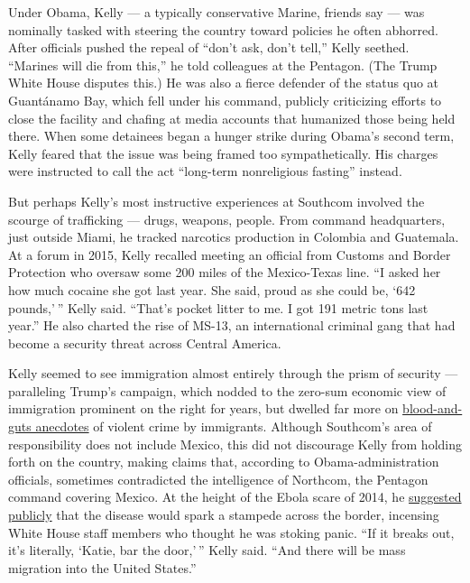 Under Obama, Kelly --- a typically conservative Marine, friends say ---
was nominally tasked with steering the country toward policies he often
abhorred. After officials pushed the repeal of ``don't ask, don't
tell,'' Kelly seethed. ``Marines will die from this,'' he told
colleagues at the Pentagon. (The Trump White House disputes this.) He
was also a fierce defender of the status quo at Guantánamo Bay, which
fell under his command, publicly criticizing efforts to close the
facility and chafing at media accounts that humanized those being held
there. When some detainees began a hunger strike during Obama's second
term, Kelly feared that the issue was being framed too sympathetically.
His charges were instructed to call the act ``long-term nonreligious
fasting'' instead.

But perhaps Kelly's most instructive experiences at Southcom involved
the scourge of trafficking --- drugs, weapons, people. From command
headquarters, just outside Miami, he tracked narcotics production in
Colombia and Guatemala. At a forum in 2015, Kelly recalled meeting an
official from Customs and Border Protection who oversaw some 200 miles
of the Mexico-Texas line. ``I asked her how much cocaine she got last
year. She said, proud as she could be, `642 pounds,' '' Kelly said.
``That's pocket litter to me. I got 191 metric tons last year.'' He also
charted the rise of MS-13, an international criminal gang that had
become a security threat across Central America.

Kelly seemed to see immigration almost entirely through the prism of
security --- paralleling Trump's campaign, which nodded to the zero-sum
economic view of immigration prominent on the right for years, but
dwelled far more on
\href{https://www.nytimes3xbfgragh.onion/2016/09/02/us/politics/transcript-trump-immigration-speech.html}{blood-and-guts
anecdotes} of violent crime by immigrants. Although Southcom's area of
responsibility does not include Mexico, this did not discourage Kelly
from holding forth on the country, making claims that, according to
Obama-administration officials, sometimes contradicted the intelligence
of Northcom, the Pentagon command covering Mexico. At the height of the
Ebola scare of 2014, he
\href{https://www.youtube.com/watch?v=_MzR6Kl5VPI}{suggested publicly}
that the disease would spark a stampede across the border, incensing
White House staff members who thought he was stoking panic. ``If it
breaks out, it's literally, `Katie, bar the door,' '' Kelly said. ``And
there will be mass migration into the United States.''

